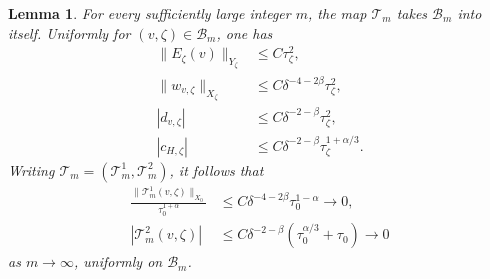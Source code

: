 \documentclass[a4paper,11pt,oneside,reqno]{amsart}
\numberwithin{equation}{section}
\newtheorem{lemma}[theorem]{Lemma}
\theoremstyle{definition}
\begin{document}
\begin{lemma}
    \label{lem:s4-coupled-self-map}
    For every sufficiently large integer $m$, the map
    $\mathcal T_m$ takes $\mathcal B_m$ into itself.
    Uniformly for $(v,\zeta)\in\mathcal B_m$, one has
    \begin{align}
        \|E_\zeta(v)\|_{Y_\zeta}
        &\leq C\tau_\zeta^2,
        \label{eq:s4-coupled-source-bound}\\
        \|w_{v,\zeta}\|_{X_\zeta}
        &\leq C\delta^{-4-2\beta}\tau_\zeta^2,
        \label{eq:s4-coupled-w-bound}\\
        |d_{v,\zeta}|
        &\leq C\delta^{-2-\beta}\tau_\zeta^2,
        \label{eq:s4-coupled-d-bound}\\
        |c_{H,\zeta}|
        &\leq C\delta^{-2-\beta}\tau_\zeta^{1+\alpha/3}.
        \label{eq:s4-coupled-cH-bound}
    \end{align}
    Writing $\mathcal T_m=(\mathcal T_m^1,\mathcal T_m^2)$,
    it follows that
    \begin{align}
        \frac{\|\mathcal T_m^1(v,\zeta)\|_{X_0}}
        {\tau_0^{1+\alpha}}
        &\leq C\delta^{-4-2\beta}\tau_0^{1-\alpha}
        \rightarrow0,
        \label{eq:s4-coupled-function-smallness}\\
        |\mathcal T_m^2(v,\zeta)|
        &\leq C\delta^{-2-\beta}
        (\tau_0^{\alpha/3}+\tau_0)
        \rightarrow0
        \label{eq:s4-coupled-parameter-smallness}
    \end{align}
    as $m\to\infty$, uniformly on $\mathcal B_m$.
\end{lemma}
\end{document}
